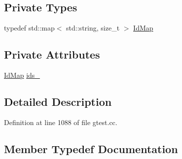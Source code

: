 \subsection*{Private Types}
\begin{DoxyCompactItemize}
\item 
typedef std\+::map$<$ std\+::string, size\+\_\+t $>$ \hyperlink{classtesting_1_1internal_1_1edit__distance_1_1anonymous__namespace_02gtest_8cc_03_1_1InternalStrings_a8c510fbc110525be4b4f9568da60d354}{Id\+Map}
\end{DoxyCompactItemize}
\subsection*{Private Attributes}
\begin{DoxyCompactItemize}
\item 
\hyperlink{classtesting_1_1internal_1_1edit__distance_1_1anonymous__namespace_02gtest_8cc_03_1_1InternalStrings_a8c510fbc110525be4b4f9568da60d354}{Id\+Map} \hyperlink{classtesting_1_1internal_1_1edit__distance_1_1anonymous__namespace_02gtest_8cc_03_1_1InternalStrings_a86d6b4db4bf034a8d2cc668df514d058}{ids\+\_\+}
\end{DoxyCompactItemize}


\subsection{Detailed Description}


Definition at line 1088 of file gtest.\+cc.



\subsection{Member Typedef Documentation}
\mbox{\label{classtesting_1_1internal_1_1edit__distance_1_1anonymous__namespace_02gtest_8cc_03_1_1InternalStrings_a8c510fbc110525be4b4f9568da60d354}} 
